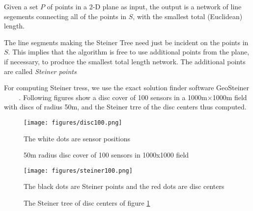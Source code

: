 \begin{definition}
Given a set $P$ of points in a 2-D plane as input, the output is a network of line segements connecting all of the points in $S$, with the smallest total (Euclidean) length.
\end{definition}
The line segments making the Steiner Tree need just be incident on the points in $S$. This implies that the algorithm is free to use additional points from the plane, if necessary, to produce the smallest total length network. The additional points are called \emph{Steiner points}

For computing Steiner tress, we use the exact solution finder software GeoSteiner ~\cite{geosteiner1} ~\cite{geosteiner2} ~\cite{geosteiner3}. Following figures show a disc cover of 100 sensors in a 1000m$\times$1000m field with discs of radius 50m, and the Steiner trre of the disc centers thus computed.

\begin{figure}[H]
\centering
\texttt{[image: figures/disc100.png]}
\caption{50m radius disc cover of 100 sensors in 1000x1000 field} \label{fig:disc100}
\medskip
\small
The white dots are sensor positions
\end{figure}

\begin{figure}[H]
\centering
\texttt{[image: figures/steiner100.png]}
\caption{The Steiner tree of disc centers of figure \ref{fig:disc100}}
\medskip
\small
The black dots are Steiner points and the red dots are disc centers
\end{figure}
